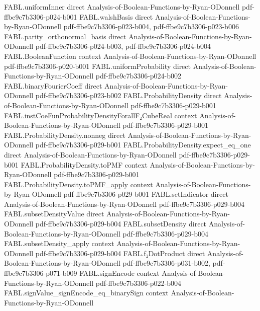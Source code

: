 \begin{theorem}
\proofstep
  {FABL.uniformInner}
  {direct}
  {Analysis-of-Boolean-Functions-by-Ryan-ODonnell}
  {pdf-ffbe9c7b3306-p024-b001}
\proofstep
  {FABL.walshBasis}
  {direct}
  {Analysis-of-Boolean-Functions-by-Ryan-ODonnell}
  {pdf-ffbe9c7b3306-p023-b004,
    pdf-ffbe9c7b3306-p023-b006}
\proofstep
  {FABL.parity_orthonormal_basis}
  {direct}
  {Analysis-of-Boolean-Functions-by-Ryan-ODonnell}
  {pdf-ffbe9c7b3306-p024-b003,
    pdf-ffbe9c7b3306-p024-b004}
\proofstep
  {FABL.BooleanFunction}
  {context}
  {Analysis-of-Boolean-Functions-by-Ryan-ODonnell}
  {pdf-ffbe9c7b3306-p020-b001}
\proofstep
  {FABL.uniformProbability}
  {direct}
  {Analysis-of-Boolean-Functions-by-Ryan-ODonnell}
  {pdf-ffbe9c7b3306-p024-b002}
\proofstep
  {FABL.binaryFourierCoeff}
  {direct}
  {Analysis-of-Boolean-Functions-by-Ryan-ODonnell}
  {pdf-ffbe9c7b3306-p023-b002}
\proofstep
  {FABL.ProbabilityDensity}
  {direct}
  {Analysis-of-Boolean-Functions-by-Ryan-ODonnell}
  {pdf-ffbe9c7b3306-p029-b001}
\proofstep
  {FABL.instCoeFunProbabilityDensityForallF₂CubeReal}
  {context}
  {Analysis-of-Boolean-Functions-by-Ryan-ODonnell}
  {pdf-ffbe9c7b3306-p029-b001}
\proofstep
  {FABL.ProbabilityDensity.nonneg}
  {direct}
  {Analysis-of-Boolean-Functions-by-Ryan-ODonnell}
  {pdf-ffbe9c7b3306-p029-b001}
\proofstep
  {FABL.ProbabilityDensity.expect_eq_one}
  {direct}
  {Analysis-of-Boolean-Functions-by-Ryan-ODonnell}
  {pdf-ffbe9c7b3306-p029-b001}
\proofstep
  {FABL.ProbabilityDensity.toPMF}
  {context}
  {Analysis-of-Boolean-Functions-by-Ryan-ODonnell}
  {pdf-ffbe9c7b3306-p029-b001}
\proofstep
  {FABL.ProbabilityDensity.toPMF_apply}
  {context}
  {Analysis-of-Boolean-Functions-by-Ryan-ODonnell}
  {pdf-ffbe9c7b3306-p029-b001}
\proofstep
  {FABL.setIndicator}
  {direct}
  {Analysis-of-Boolean-Functions-by-Ryan-ODonnell}
  {pdf-ffbe9c7b3306-p029-b004}
\proofstep
  {FABL.subsetDensityValue}
  {direct}
  {Analysis-of-Boolean-Functions-by-Ryan-ODonnell}
  {pdf-ffbe9c7b3306-p029-b004}
\proofstep
  {FABL.subsetDensity}
  {direct}
  {Analysis-of-Boolean-Functions-by-Ryan-ODonnell}
  {pdf-ffbe9c7b3306-p029-b004}
\proofstep
  {FABL.subsetDensity_apply}
  {context}
  {Analysis-of-Boolean-Functions-by-Ryan-ODonnell}
  {pdf-ffbe9c7b3306-p029-b004}
\proofstep
  {FABL.f₂DotProduct}
  {direct}
  {Analysis-of-Boolean-Functions-by-Ryan-ODonnell}
  {pdf-ffbe9c7b3306-p031-b002,
    pdf-ffbe9c7b3306-p071-b009}
\proofstep
  {FABL.signEncode}
  {context}
  {Analysis-of-Boolean-Functions-by-Ryan-ODonnell}
  {pdf-ffbe9c7b3306-p022-b004}
\proofstep
  {FABL.signValue_signEncode_eq_binarySign}
  {context}
  {Analysis-of-Boolean-Functions-by-Ryan-ODonnell}

\end{theorem}
